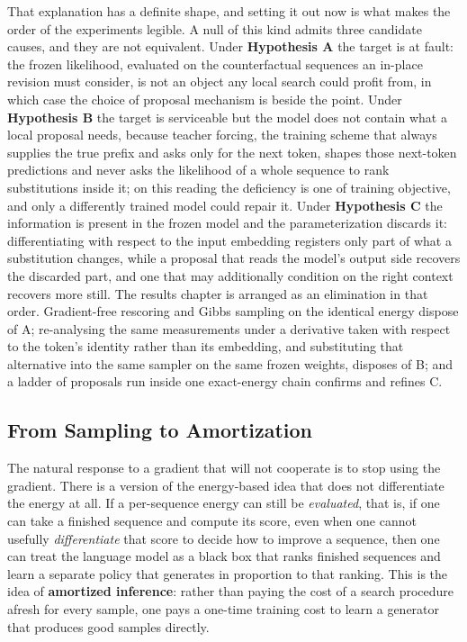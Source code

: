 That explanation has a definite shape, and setting it out now is what makes the order of the experiments legible. A null of this kind admits three candidate causes, and they are not equivalent. Under \textbf{Hypothesis A} the target is at fault: the frozen likelihood, evaluated on the counterfactual sequences an in-place revision must consider, is not an object any local search could profit from, in which case the choice of proposal mechanism is beside the point. Under \textbf{Hypothesis B} the target is serviceable but the model does not contain what a local proposal needs, because teacher forcing, the training scheme that always supplies the true prefix and asks only for the next token, shapes those next-token predictions and never asks the likelihood of a whole sequence to rank substitutions inside it; on this reading the deficiency is one of training objective, and only a differently trained model could repair it. Under \textbf{Hypothesis C} the information is present in the frozen model and the parameterization discards it: differentiating with respect to the input embedding registers only part of what a substitution changes, while a proposal that reads the model's output side recovers the discarded part, and one that may additionally condition on the right context recovers more still. The results chapter is arranged as an elimination in that order. Gradient-free rescoring and Gibbs sampling on the identical energy dispose of A; re-analysing the same measurements under a derivative taken with respect to the token's identity rather than its embedding, and substituting that alternative into the same sampler on the same frozen weights, disposes of B; and a ladder of proposals run inside one exact-energy chain confirms and refines C.

\subsection{From Sampling to Amortization}
\label{sec:intro-amortize}

The natural response to a gradient that will not cooperate is to stop using the gradient. There is a version of the energy-based idea that does not differentiate the energy at all. If a per-sequence energy can still be \emph{evaluated}, that is, if one can take a finished sequence and compute its score, even when one cannot usefully \emph{differentiate} that score to decide how to improve a sequence, then one can treat the language model as a black box that ranks finished sequences and learn a separate policy that generates in proportion to that ranking. This is the idea of \textbf{amortized inference}: rather than paying the cost of a search procedure afresh for every sample, one pays a one-time training cost to learn a generator that produces good samples directly.

